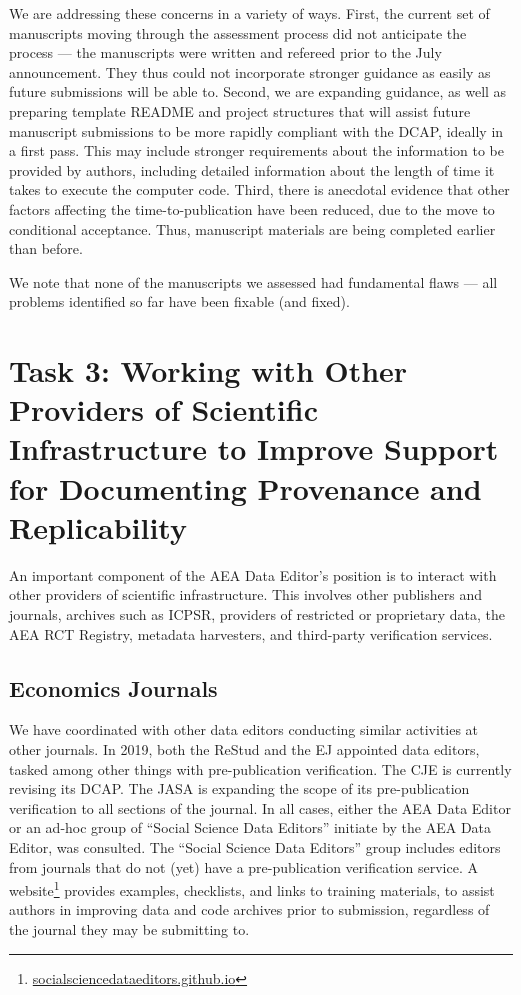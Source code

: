 \documentclass[PP]{AEA}
\newcommand{\urlcite}[2]{#2\footnote{\url{#1}}}
\begin{document}
We are addressing these concerns in a variety of ways. First, the current set of manuscripts moving through the assessment process did not anticipate the process --- the manuscripts were written and refereed prior to the July announcement. They thus could not incorporate stronger guidance as easily as future submissions will be able to. Second, we are expanding guidance, as well as preparing template README and project structures that will assist future manuscript submissions to be more rapidly compliant with the \ac{DCAP}, ideally in a first pass. This may include stronger requirements about the information to be provided by authors, including detailed information about the length of time it takes to execute the computer code.
Third, there is anecdotal evidence that other factors affecting the time-to-publication have been reduced, due to the move to conditional acceptance. Thus, manuscript materials are being completed earlier than before. 

We note that none of the \jiramcs{} manuscripts we assessed had  fundamental flaws --- all problems identified so far have been fixable (and fixed). 





\section{Task 3: Working with Other Providers of Scientific Infrastructure to Improve Support for Documenting Provenance and Replicability}
\label{sec:coordination}

An important component of the AEA Data Editor's position is to interact with other providers of scientific infrastructure. This involves other publishers and journals, archives such as ICPSR, providers of restricted or proprietary data, the AEA RCT Registry, metadata harvesters, and third-party verification services. 

\subsection{Economics Journals}

We have coordinated with other data editors conducting similar activities at other journals. In 2019, both the \ac{ReStud} and the \ac{EJ}  appointed data editors, tasked among other things with pre-publication verification. The \ac{CJE} is currently revising its \ac{DCAP}. The \ac{JASA} is expanding the scope of its pre-publication verification to all sections of the journal. In all cases, either the AEA Data Editor or an ad-hoc group of ``Social Science Data Editors'' initiate by the AEA Data Editor, was consulted. The ``Social Science Data Editors'' group includes  editors from journals that do not (yet) have a pre-publication verification service. A  \urlcite{socialsciencedataeditors.github.io}{website} provides examples, checklists, and links to training materials, to assist authors in  improving data and code archives prior to submission, regardless of the journal they may be submitting to.
\end{document}
